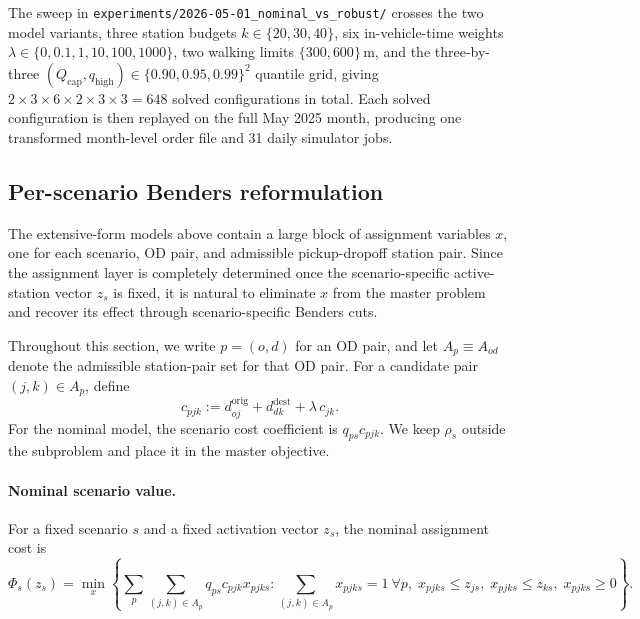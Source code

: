 \documentclass[11pt]{article}
\theoremstyle{definition}
\begin{document}
The sweep in \texttt{experiments/2026-05-01\_nominal\_vs\_robust/} crosses
the two model variants, three station budgets $k \in \{20, 30, 40\}$, six
in-vehicle-time weights $\lambda \in \{0, 0.1, 1, 10, 100, 1000\}$, two
walking limits $\{300, 600\}$\,m, and the three-by-three
$(Q_{\mathrm{cap}}, q_{\mathrm{high}}) \in \{0.90, 0.95, 0.99\}^2$
quantile grid, giving $2 \times 3 \times 6 \times 2 \times 3 \times 3 = 648$
solved configurations in total.  Each solved configuration is then replayed
on the full May 2025 month, producing one transformed month-level order file
and 31 daily simulator jobs.

\subsection{Per-scenario Benders reformulation}
\label{sec:benders}

The extensive-form models above contain a large block of assignment variables
\(x\), one for each scenario, OD pair, and admissible pickup-dropoff station
pair. Since the assignment layer is completely determined once the
scenario-specific active-station vector \(z_s\) is fixed, it is natural to
eliminate \(x\) from the master problem and recover its effect through
scenario-specific Benders cuts.

Throughout this section, we write \(p=(o,d)\) for an OD pair, and let
\(A_p \equiv A_{od}\) denote the admissible station-pair set for that OD pair.
For a candidate pair \((j,k)\in A_p\), define
\[
	c_{pjk}
	:=
	d^{\mathrm{orig}}_{oj}+d^{\mathrm{dest}}_{dk}+\lambda\,c_{jk}.
\]
For the nominal model, the scenario cost coefficient is \(q_{ps}c_{pjk}\).
We keep \(\rho_s\) outside the subproblem and place it in the master objective.

\paragraph{Nominal scenario value.}
For a fixed scenario \(s\) and a fixed activation vector \(z_s\), the nominal
assignment cost is
\begin{equation}
	\Phi_s(z_s)
	=
	\min_{x}
	\left\{
	\sum_{p}\sum_{(j,k)\in A_p} q_{ps} c_{pjk} x_{pjks}
	:
	\sum_{(j,k)\in A_p} x_{pjks}=1\ \forall p,\;
	x_{pjks}\le z_{js},\;
	x_{pjks}\le z_{ks},\;
	x_{pjks}\ge 0
	\right\}.
	\label{eq:benders-nominal-subproblem}
\end{equation}
\end{document}
